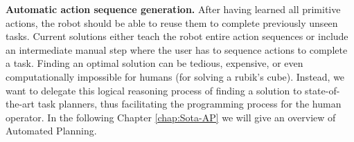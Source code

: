 \textbf{Automatic action sequence generation.}
After having learned all primitive actions, the robot should be able to reuse them to complete previously unseen tasks.
Current solutions either teach the robot entire action sequences or include an intermediate manual step where the user has to sequence actions to complete a task.
Finding an optimal solution can be tedious, expensive, or even computationally impossible for humans (\eg for solving a rubik's cube).
Instead, we want to delegate this logical reasoning process of finding a solution to state-of-the-art task planners, thus facilitating the programming process for the human operator.
In the following Chapter \ref{chap:Sota-AP} we will give an overview of Automated Planning.